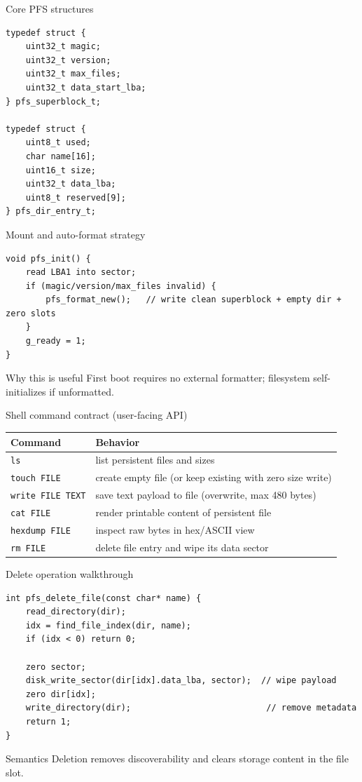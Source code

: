 \documentclass[aspectratio=169]{beamer}
\newcommand{\concept}[2]{%
  \begin{block}{#1}\smallskip #2\smallskip\end{block}\vspace{5pt}}
\begin{document}
\begin{frame}[fragile]{Core PFS structures}
\begin{lstlisting}[style=clang]
typedef struct {
    uint32_t magic;
    uint32_t version;
    uint32_t max_files;
    uint32_t data_start_lba;
} pfs_superblock_t;

typedef struct {
    uint8_t used;
    char name[16];
    uint16_t size;
    uint32_t data_lba;
    uint8_t reserved[9];
} pfs_dir_entry_t;
\end{lstlisting}
\end{frame}

\begin{frame}[fragile]{Mount and auto-format strategy}
\begin{lstlisting}[style=clang]
void pfs_init() {
    read LBA1 into sector;
    if (magic/version/max_files invalid) {
        pfs_format_new();   // write clean superblock + empty dir + zero slots
    }
    g_ready = 1;
}
\end{lstlisting}
\concept{Why this is useful}{
  First boot requires no external formatter; filesystem self-initializes if unformatted.
}
\end{frame}

\begin{frame}{Shell command contract (user-facing API)}
  \small
  \begin{tabular}{@{}p{3.1cm}p{8.9cm}@{}}
    \toprule
    \textbf{Command} & \textbf{Behavior} \\
    \midrule
    \texttt{ls} & list persistent files and sizes \\
    \texttt{touch FILE} & create empty file (or keep existing with zero size write) \\
    \texttt{write FILE TEXT} & save text payload to file (overwrite, max 480 bytes) \\
    \texttt{cat FILE} & render printable content of persistent file \\
    \texttt{hexdump FILE} & inspect raw bytes in hex/ASCII view \\
    \texttt{rm FILE} & delete file entry and wipe its data sector \\
    \bottomrule
  \end{tabular}
\end{frame}

\begin{frame}[fragile]{Delete operation walkthrough}
\begin{lstlisting}[style=clang]
int pfs_delete_file(const char* name) {
    read_directory(dir);
    idx = find_file_index(dir, name);
    if (idx < 0) return 0;

    zero sector;
    disk_write_sector(dir[idx].data_lba, sector);  // wipe payload
    zero dir[idx];
    write_directory(dir);                           // remove metadata
    return 1;
}
\end{lstlisting}
\concept{Semantics}{
  Deletion removes discoverability and clears storage content in the file slot.
}
\end{frame}
\end{document}
